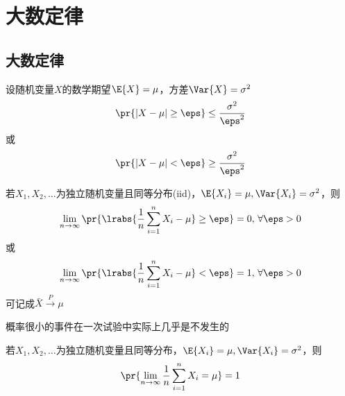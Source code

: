 
\section{大数定律}
\subsection{大数定律}
\begin{theorem}
设随机变量$X$的数学期望$\E{X}=\mu$，方差$\Var{X}=\sigma^2$
\[\pr{|X-\mu|\geq\eps}\leq\dfrac{\sigma^2}{\eps^2}\]
或
\[\pr{|X-\mu|<\eps}\geq\frac{\sigma^2}{\eps^2}\]
\end{theorem}
\begin{theorem}[弱大数定律(辛钦)]
若$X_1,X_2,\ldots$为独立随机变量且同等分布(iid)，$\E{X_i}=\mu,\Var{X_i}=\sigma^2$，则
\[\lim_{n\to\infty}\pr{\lrabs{\dfrac{1}{n}\sum_{i=1}^nX_i-\mu}\geq\eps}=0,\,\forall\eps>0\]
或
\[\lim_{n\to\infty}\pr{\lrabs{\dfrac{1}{n}\sum_{i=1}^nX_i-\mu}<\eps}=1,\,\forall\eps>0\]
可记成$\bar{X}\xrightarrow{P}\mu$
\end{theorem}
\begin{theorem}[实际推断原理]
概率很小的事件在一次试验中实际上几乎是不发生的
\end{theorem}
\begin{theorem}[强大数定律]
若$X_1,X_2,\ldots$为独立随机变量且同等分布，$\E{X_i}=\mu,\Var{X_i}=\sigma^2$，则
\[\pr{\lim_{n\to\infty}\dfrac{1}{n}\sum_{i=1}^nX_i=\mu}=1\]
\end{theorem}

